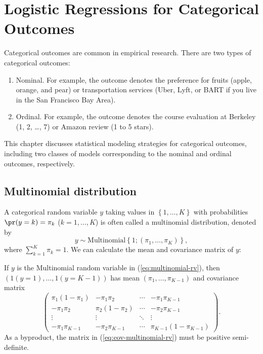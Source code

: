 
\chapter{Logistic Regressions for Categorical Outcomes} 
\label{chapter::logit-categorical}
 

Categorical outcomes are common in empirical research.  There are two types of categorical outcomes:
\begin{enumerate}[label=(T\arabic*), ref=T\arabic*]
\item
Nominal.  For example, the outcome denotes the preference for fruits (apple, orange, and pear) or transportation services (Uber, Lyft, or BART if you live in the San Francisco Bay Area). 
\item
Ordinal.  For example, the outcome denotes the course evaluation at Berkeley (1, 2, \ldots, 7) or Amazon review (1 to 5 stars).  
\end{enumerate}
This chapter discusses statistical modeling strategies for categorical outcomes, including two classes of models corresponding to the nominal and ordinal outcomes, respectively.  
 
 

\section{Multinomial distribution}



A categorical random variable $y$ taking values in $\left\{ 1,\ldots,K\right\} $
with probabilities $\pr(y=k)=\pi_{k}$  ($k=1,\ldots,K$) is
often called a multinomial distribution, denoted by
\begin{equation}
y\sim\text{Multinomial}\left\{ 1;(\pi_{1},\ldots,\pi_{K})\right\} ,\label{eq:multinomial-rv}
\end{equation}
where $\sum_{k=1}^{K}\pi_{k}=1.$
We can calculate the mean and covariance matrix of $y$:
\begin{proposition}
\label{proposition:positive-semi-definite-multinomial}If $y$ is the Multinomial
random variable in (\ref{eq:multinomial-rv}), then $(1(y=1),\ldots,1(y=K-1))$
has mean $(\pi_{1},\ldots,\pi_{K-1})$ and covariance matrix
\begin{equation}
\left(\begin{array}{cccc}
\pi_{1}(1-\pi_{1}) & -\pi_{1}\pi_{2} & \cdots & -\pi_{1}\pi_{K-1}\\
-\pi_{1}\pi_{2} & \pi_{2}(1-\pi_{2}) & \cdots & -\pi_{2}\pi_{K-1}\\
\vdots & \vdots & \ddots & \vdots\\
-\pi_{1}\pi_{K-1} & -\pi_{2}\pi_{K-1} & \cdots & \pi_{K-1}(1-\pi_{K-1})
\end{array}\right).\label{eq:cov-multinomial-rv}
\end{equation}
As a byproduct, the matrix in (\ref{eq:cov-multinomial-rv})
must be positive semi-definite.
\end{proposition}



